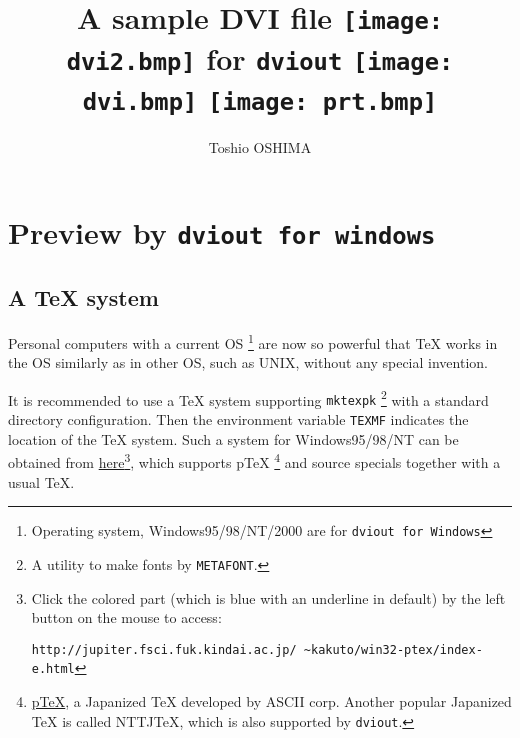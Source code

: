 \documentclass{article}
\title{A sample DVI file%
{\raise-4.5pt\hbox{\texttt{[image: dvi2.bmp]}}}
for {\tt dviout}
{\raise-4pt\hbox{\texttt{[image: dvi.bmp]}}}%
{\raise-4.5pt\hbox{\texttt{[image: prt.bmp]}}}}
\author{Toshio OSHIMA}
\date{\name{date}{December 18, 2005}}
\begin{document}
\maketitle
\tableofcontents
\newpage
\section{Preview by {\tt dviout for windows}}%
\subsection{A {\TeX} system}%

Personal computers with a current OS%
\footnote{Operating system, Windows95/98/NT/2000 are for {\tt dviout for Windows}}
are now so powerful that {\TeX} works in the OS similarly as in 
other OS, such as UNIX, without any special invention.
 
It is recommended to use a {\TeX} system supporting {\tt mktexpk}%
\footnote{A utility to make fonts by {\tt METAFONT}.}
with a standard directory configuration.
Then the environment variable {\tt TEXMF} indicates the location of 
the {\TeX} system.
Such a system for Windows95/98/NT can be obtained from
\href{http://jupiter.fsci.fuk.kindai.ac.jp/~kakuto/win32-ptex/index-e.html}
{here}\footnote{Click the colored part (which is blue with an underline in 
default) by the left button on the mouse to access:

\tt http://jupiter.fsci.fuk.kindai.ac.jp/%
\~{}kakuto/win32-ptex/index-e.html}, which supports p\TeX%
\footnote{\href{http://www.ascii.co.jp/pb/ptex}{p\TeX}, 
a Japanized {\TeX} developed by ASCII corp.
Another popular Japanized {\TeX} is called NTTJ\TeX, which is
also supported by {\tt dviout}.}
and source specials together with a usual {\TeX}.

\end{document}
